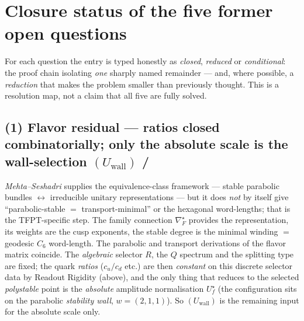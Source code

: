 \documentclass[11pt,a4paper]{article}
\theoremstyle{definition}
\begin{document}
\section{Closure status of the five former open questions}
For each question the entry is typed honestly as \emph{closed}, \emph{reduced} or \emph{conditional}: the
proof chain isolating \emph{one} sharply named remainder --- and, where possible, a \emph{reduction} that
makes the problem smaller than previously thought. This is a resolution map, not a claim that all five are
fully solved.

\subsection*{(1) Flavor residual --- ratios closed combinatorially; only the absolute scale is the wall-selection $(U_{\mathrm{wall}})$ \mE/\mO}
\emph{Mehta--Seshadri} supplies the equivalence-class framework --- stable parabolic bundles
$\leftrightarrow$ irreducible unitary representations --- but it does \emph{not} by itself give
``parabolic-stable $=$ transport-minimal'' or the hexagonal word-lengths; that is the TFPT-specific step.
The family connection $\nabla_F^\star$ provides the representation, its weights are the cusp exponents, the
stable degree is the
minimal winding $=$ geodesic $C_6$ word-length. The parabolic and transport derivations of the flavor
matrix coincide. The \emph{algebraic} selector $R$, the $Q$ spectrum and the splitting type are fixed; the
quark \emph{ratios} ($c_u/c_d$ etc.) are then \emph{constant} on this discrete selector data by Readout
Rigidity (above), and the only thing that reduces to the selected \emph{polystable} point is the
\emph{absolute} amplitude normalisation $U_f^\star$ (the configuration sits on the parabolic \emph{stability
wall}, $w=(2,1,1)$). So $(U_{\mathrm{wall}})$ is the remaining input for the absolute scale only.
\end{document}

